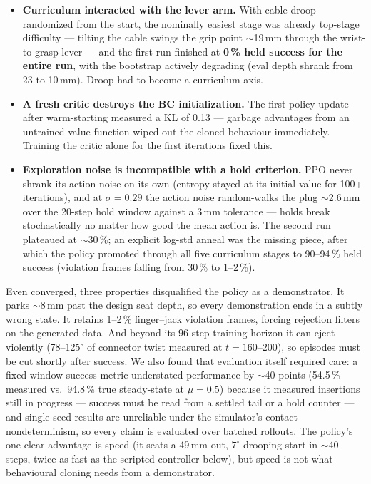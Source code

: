 \begin{itemize}
  \item \textbf{Curriculum interacted with the lever arm.} With cable
        droop randomized from the start, the nominally easiest stage
        was already top-stage difficulty --- tilting the cable swings
        the grip point $\sim$19\,mm through the wrist-to-grasp lever
        --- and the first run finished at \textbf{0\,\% held success
        for the entire run}, with the bootstrap actively degrading
        (eval depth shrank from 23 to 10\,mm). Droop had to become a
        curriculum axis.
  \item \textbf{A fresh critic destroys the BC initialization.} The
        first policy update after warm-starting measured a KL of
        0.13 --- garbage advantages from an untrained value function
        wiped out the cloned behaviour immediately. Training the
        critic alone for the first iterations fixed this.
  \item \textbf{Exploration noise is incompatible with a hold
        criterion.} PPO never shrank its action noise on its own
        (entropy stayed at its initial value for 100+ iterations),
        and at $\sigma = 0.29$ the action noise random-walks the plug
        $\sim$2.6\,mm over the 20-step hold window against a 3\,mm
        tolerance --- holds break stochastically no matter how good
        the mean action is. The second run plateaued at $\sim$30\,\%;
        an explicit log-std anneal was the missing piece, after which
        the policy promoted through all five curriculum stages to
        90--94\,\% held success (violation frames falling from
        30\,\% to 1--2\,\%).
\end{itemize}

Even converged, three properties disqualified the policy as a
demonstrator. It parks $\sim$8\,mm past the design seat depth, so
every demonstration ends in a subtly wrong state. It retains
1--2\,\% finger--jack violation frames, forcing rejection filters on
the generated data. And beyond its 96-step training horizon it can
eject violently (78--125$^{\circ}$ of connector twist measured at
$t = 160$--$200$), so episodes must be cut shortly after success. We
also found that evaluation itself required care: a fixed-window
success metric understated performance by $\sim$40 points
(54.5\,\% measured vs.\ 94.8\,\% true steady-state at $\mu = 0.5$)
because it measured insertions still in progress --- success must be
read from a settled tail or a hold counter --- and single-seed
results are unreliable
under the simulator's contact nondeterminism, so every claim is
evaluated over batched rollouts. The policy's one clear advantage is
speed (it seats a 49\,mm-out, $7^{\circ}$-drooping start in
$\sim$40 steps, twice as fast as the scripted controller below), but
speed is not what behavioural cloning needs from a demonstrator.

